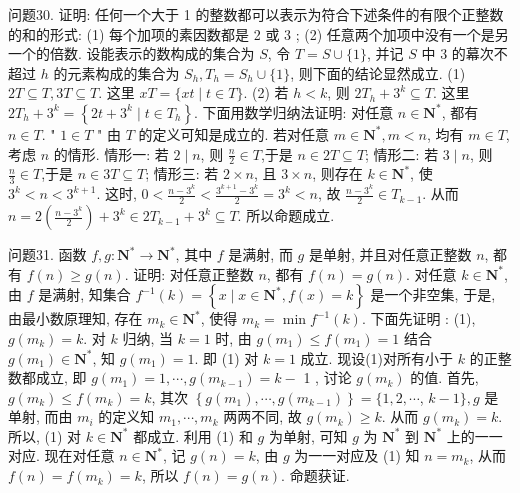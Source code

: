 问题30. 证明: 任何一个大于 1 的整数都可以表示为符合下述条件的有限个正整数的和的形式:
(1) 每个加项的素因数都是 2 或 3 ;
(2) 任意两个加项中没有一个是另一个的倍数.
设能表示的数构成的集合为 $S$, 令 $T=S \cup\{1\}$, 并记 $S$ 中 3 的幕次不超过 $h$ 的元素构成的集合为 $S_h, T_h=S_h \cup\{1\}$, 则下面的结论显然成立.
(1) $2 T \subseteq T, 3 T \subseteq T$. 这里 $x T=\{x t \mid t \in T\}$.
(2) 若 $h<k$, 则 $2 T_h+3^k \subseteq T$. 这里 $2 T_h+3^k=\left\{2 t+3^k \mid t \in T_h\right\}$.
下面用数学归纳法证明: 对任意 $n \in \mathbf{N}^*$, 都有 $n \in T$.
" $1 \in T$ " 由 $T$ 的定义可知是成立的.
若对任意 $m \in \mathbf{N}^*, m<n$, 均有 $m \in T$, 考虑 $n$ 的情形.
情形一: 若 $2 \mid n$, 则 $\frac{n}{2} \in T$,于是 $n \in 2 T \subseteq T$;
情形二: 若 $3 \mid n$, 则 $\frac{n}{3} \in T$,于是 $n \in 3 T \subseteq T$;
情形三: 若 $2 \times n$, 且 $3 \times n$, 则存在 $k \in \mathbf{N}^*$, 使 $3^k<n<3^{k+1}$. 这时, $0<\frac{n-3^k}{2}< \frac{3^{k+1}-3^k}{2}=3^k<n$, 故 $\frac{n-3^k}{2} \in T_{k-1}$. 从而 $n=2\left(\frac{n-3^k}{2}\right)+3^k \in 2 T_{k-1}+3^k \subseteq T$.
所以命题成立.



问题31. 函数 $f, g: \mathbf{N}^* \rightarrow \mathbf{N}^*$, 其中 $f$ 是满射, 而 $g$ 是单射, 并且对任意正整数 $n$, 都有 $f(n) \geqslant g(n)$. 证明: 对任意正整数 $n$, 都有 $f(n)=g(n)$.
对任意 $k \in \mathbf{N}^*$, 由 $f$ 是满射, 知集合 $f^{-1}(k)=\left\{x \mid x \in \mathbf{N}^*, f(x)=k\right\}$ 是一个非空集, 于是, 由最小数原理知, 存在 $m_k \in \mathbf{N}^*$, 使得 $m_k= \min f^{-1}(k)$.
下面先证明 : (1), $g\left(m_k\right)=k$.
对 $k$ 归纳, 当 $k=1$ 时, 由 $g\left(m_1\right) \leqslant f\left(m_1\right)=1$ 结合 $g\left(m_1\right) \in \mathbf{N}^*$, 知 $g\left(m_1\right)=1$. 即 (1) 对 $k=1$ 成立.
现设(1)对所有小于 $k$ 的正整数都成立, 即 $g\left(m_1\right)=1, \cdots, g\left(m_{k-1}\right)=k-$ 1 , 讨论 $g\left(m_k\right)$ 的值.
首先, $g\left(m_k\right) \leqslant f\left(m_k\right)=k$, 其次 $\left\{g\left(m_1\right), \cdots, g\left(m_{k-1}\right)\right\}=\{1,2, \cdots$, $k-1\}, g$ 是单射, 而由 $m_i$ 的定义知 $m_1, \cdots, m_k$ 两两不同, 故 $g\left(m_k\right) \geqslant k$. 从而 $g\left(m_k\right)=k$. 所以, (1) 对 $k \in \mathbf{N}^*$ 都成立.
利用 (1) 和 $g$ 为单射, 可知 $g$ 为 $\mathbf{N}^*$ 到 $\mathbf{N}^*$ 上的一一对应.
现在对任意 $n \in \mathbf{N}^*$, 记 $g(n)=k$, 由 $g$ 为一一对应及 (1) 知 $n=m_k$, 从而 $f(n)=f\left(m_k\right)=k$, 所以 $f(n)=g(n)$. 命题获证.



